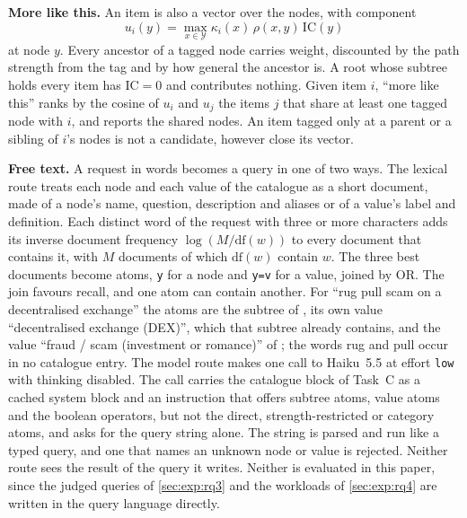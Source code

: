 \textbf{More like this.} An item is also a vector over the nodes, with
component
\begin{equation}
  \label{eq:itemvec}
  u_i(y) = \max_{x \in \mathcal{Y}} \kappa_i(x)\, \rho(x, y)\, \mathrm{IC}(y)
\end{equation}
at node $y$. Every ancestor of a tagged node carries weight, discounted by
the path strength from the tag and by how general the ancestor is. A root
whose subtree holds every item has $\mathrm{IC} = 0$ and contributes
nothing. Given item $i$, ``more like this'' ranks by the cosine of $u_i$ and
$u_j$ the items $j$ that share at least one tagged node with $i$, and
reports the shared nodes. An item tagged only at a parent or a sibling of
$i$'s nodes is not a candidate, however close its vector.

\textbf{Free text.} A request in words becomes a query in one of two ways.
The lexical route treats each node and each value of the catalogue as a
short document, made of a node's name, question, description and aliases or
of a value's label and definition. Each distinct word of the request with
three or more characters adds its inverse document frequency
$\log(M / \mathrm{df}(w))$ to every document that contains it, with $M$
documents of which $\mathrm{df}(w)$ contain $w$. The three best documents
become atoms, \texttt{y} for a node and \texttt{y=v} for a value, joined by
OR. The join favours recall, and one atom can contain another. For ``rug
pull scam on a decentralised exchange'' the atoms are the subtree of
, its own value ``decentralised exchange
(DEX)'', which that subtree already contains, and the value ``fraud / scam
(investment or romance)'' of ; the words
rug and pull occur in no catalogue entry. The model route makes one call to
Haiku~5.5 at effort \texttt{low} with thinking disabled. The call carries the
catalogue block of Task~C as a cached system block and an instruction that
offers subtree atoms, value atoms and the boolean operators, but not the
direct, strength-restricted or category atoms, and asks for the query string
alone. The string is parsed and run like a typed query, and one that names
an unknown node or value is rejected. Neither route sees the result of the
query it writes. Neither is evaluated in this paper, since the judged queries
of \cref{sec:exp:rq3} and the workloads of \cref{sec:exp:rq4} are written in
the query language directly.

